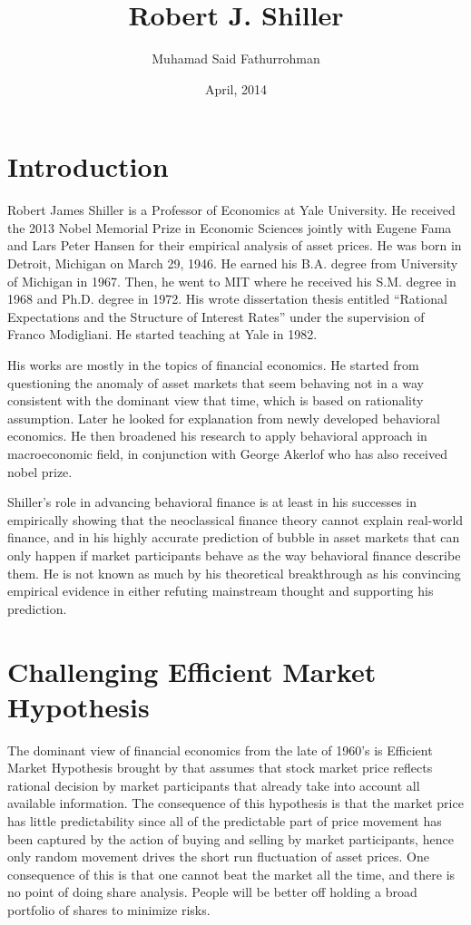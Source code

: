 \documentclass[a4paper, 12pt]{article}
\title{Robert J. Shiller}
\author{Muhamad Said Fathurrohman}
\date{April, 2014}
\begin{document}
\maketitle

\doublespace

\section{Introduction}
Robert James Shiller is a Professor of Economics at Yale University. He received the 2013 Nobel Memorial Prize in Economic Sciences jointly with Eugene Fama and Lars Peter Hansen for their empirical analysis of asset prices. He was born in Detroit, Michigan on March 29, 1946. He earned his B.A. degree from University of Michigan in 1967. Then, he went to MIT where he received his S.M. degree in 1968 and Ph.D. degree in 1972. His wrote dissertation thesis entitled ``Rational Expectations and the Structure of Interest Rates'' under the supervision of Franco Modigliani. He started teaching at Yale in 1982.  

His works are mostly in the topics of financial economics. He started from questioning the anomaly of asset markets that seem behaving not in a way consistent with the dominant view that time, which is based on rationality assumption. Later he looked for explanation from newly developed behavioral economics. He then broadened his research to apply behavioral approach in macroeconomic field, in conjunction with George Akerlof who has also received nobel prize.   

Shiller's role in advancing behavioral finance is at least in his successes in empirically showing that the neoclassical finance theory cannot explain real-world finance, and in his highly accurate prediction of bubble in asset markets that can only happen if market participants behave as the way behavioral finance describe them. He is not known as much by his theoretical breakthrough as his convincing empirical evidence in either refuting mainstream thought and supporting his prediction.   

\section{Challenging Efficient Market Hypothesis}

The dominant view of financial economics from the late of 1960's is Efficient Market Hypothesis brought by \citet{fama1965behavior} that assumes that stock market price reflects rational decision by market participants that already take into account all available information. The consequence of this hypothesis is that the market price has little predictability since all of the predictable part of price movement has been captured by the action of buying and selling by market participants, hence only random movement drives the short run fluctuation of asset prices. One consequence of this is that one cannot beat the market all the time, and there is no point of doing share analysis. People will be better off holding a broad portfolio of shares to minimize risks. 
\end{document}
